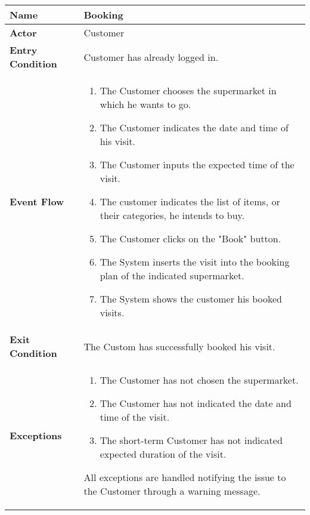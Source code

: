 \begin{center}
    \begin{tabular}{ | l | p{11cm} |}
    \hline
    \textbf{Name} & Booking \\ \hline
    \textbf{Actor} & Customer \\ \hline
    \textbf{Entry Condition} & Customer has already logged in.\\ \hline
    \textbf{Event Flow} & \begin{enumerate}
					\item The Customer chooses the supermarket in which he wants to go.
					\item The Customer indicates the date and time of his visit.
					\item The Customer inputs the expected time of the visit.
					\item The customer indicates the list of items, or their categories, he intends to buy.
					\item The Customer clicks on the "Book" button.
					\item The System inserts the visit into the booking plan of the indicated supermarket.
					\item The System shows the customer his booked visits.
		            \end{enumerate}\\  \hline
    \textbf{Exit Condition} & The Custom has successfully booked his visit. \\ \hline
    \textbf{Exceptions} & \begin{enumerate}
					\item The Customer has not chosen the supermarket.
					\item The Customer has not indicated the date and time of the visit.
					\item The short-term Customer has not indicated expected duration of the visit.
		            \end{enumerate} All exceptions are handled notifying the issue to the Customer through a warning message.\\  \hline
				
    \end{tabular}
\end{center}

